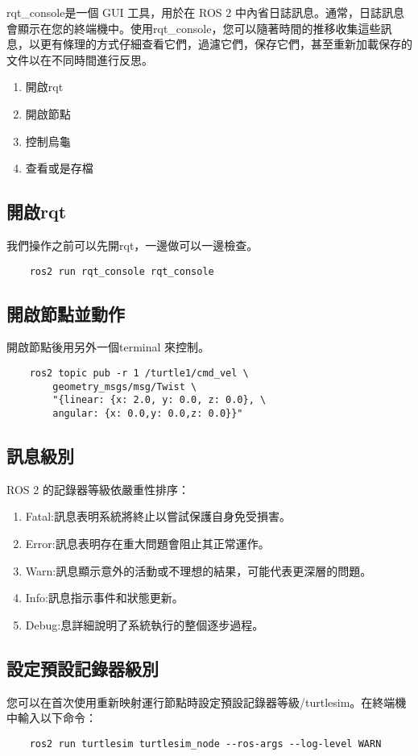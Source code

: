 rqt\_console是一個 GUI 工具，用於在 ROS 2 中內省日誌訊息。通常，日誌訊息會顯示在您的終端機中。使用rqt\_console，您可以隨著時間的推移收集這些訊息，以更有條理的方式仔細查看它們，過濾它們，保存它們，甚至重新加載保存的文件以在不同時間進行反思。


\begin{enumerate}
    \item 開啟rqt
    \item 開啟節點
    \item 控制烏龜
    \item 查看或是存檔
\end{enumerate}

\subsection{開啟rqt}
我們操作之前可以先開rqt，一邊做可以一邊檢查。
\begin{verbatim}
    ros2 run rqt_console rqt_console
\end{verbatim}
\subsection{開啟節點並動作}
開啟節點後用另外一個terminal 來控制。
\begin{verbatim}
    ros2 topic pub -r 1 /turtle1/cmd_vel \ 
        geometry_msgs/msg/Twist \ 
        "{linear: {x: 2.0, y: 0.0, z: 0.0}, \ 
        angular: {x: 0.0,y: 0.0,z: 0.0}}"
\end{verbatim}

\subsection{訊息級別}
ROS 2 的記錄器等級依嚴重性排序：
\begin{enumerate}
    \item    Fatal:訊息表明系統將終止以嘗試保護自身免受損害。
    \item    Error:訊息表明存在重大問題會阻止其正常運作。
    \item  Warn:訊息顯示意外的活動或不理想的結果，可能代表更深層的問題。
    \item  Info:訊息指示事件和狀態更新。    
    \item Debug:息詳細說明了系統執行的整個逐步過程。
\end{enumerate}

\subsection{設定預設記錄器級別}
您可以在首次使用重新映射運行節點時設定預設記錄器等級/turtlesim。在終端機中輸入以下命令：


\begin{verbatim}
    ros2 run turtlesim turtlesim_node --ros-args --log-level WARN
\end{verbatim}
